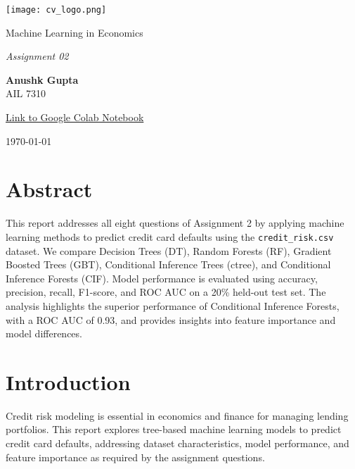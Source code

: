 \documentclass[a4paper,12pt,headsepline]{scrartcl} %
\begin{document}
\begin{titlepage}
    \centering
    \vspace*{2cm} %
    
    \texttt{[image: cv\_logo.png]} %
    
    \vspace{1cm} %
    
    {\huge\color{IITJBlue} Machine Learning in Economics}
    
    \vspace{0.5cm}
    
    {\Large\itshape Assignment 02}
    
    \vfill %
    
    {\large\bfseries Anushk Gupta} \\
    {\mdseries AIL 7310}
    
    \vspace{0.8cm}
    
    {\large \href{https://colab.research.google.com/drive/1gCpk-J7ZFCZzIAV6karfv8xuHTEOVyvK?usp=sharing}{\color{HyperlinkBlue}Link to Google Colab Notebook}}
    
    \vspace{1.5cm}
    
    {\large \today}
    
\end{titlepage}

\tableofcontents
\newpage

\section{Abstract}
This report addresses all eight questions of Assignment 2 by applying machine learning methods to predict credit card defaults using the \texttt{credit\_risk.csv} dataset. We compare Decision Trees (DT), Random Forests (RF), Gradient Boosted Trees (GBT), Conditional Inference Trees (ctree), and Conditional Inference Forests (CIF). Model performance is evaluated using accuracy, precision, recall, F1-score, and ROC AUC on a 20\% held-out test set. The analysis highlights the superior performance of Conditional Inference Forests, with a ROC AUC of 0.93, and provides insights into feature importance and model differences.

\section{Introduction}
Credit risk modeling is essential in economics and finance for managing lending portfolios. This report explores tree-based machine learning models to predict credit card defaults, addressing dataset characteristics, model performance, and feature importance as required by the assignment questions.
\end{document}
